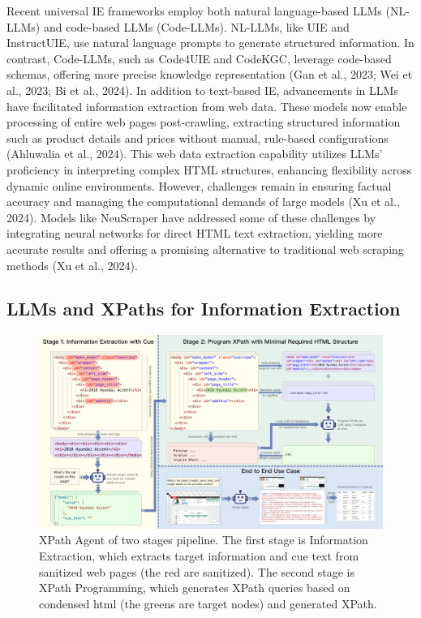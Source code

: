\documentclass[a4paper]{article}
\begin{document}
Recent universal IE frameworks employ both natural language-based LLMs (NL-LLMs) and code-based LLMs (Code-LLMs). NL-LLMs, like UIE and InstructUIE, use natural language prompts to generate structured information. In contrast, Code-LLMs, such as Code4UIE and CodeKGC, leverage code-based schemas, offering more precise knowledge representation (Gan et al., 2023; Wei et al., 2023; Bi et al., 2024). In addition to text-based IE, advancements in LLMs have facilitated information extraction from web data. These models now enable processing of entire web pages post-crawling, extracting structured information such as product details and prices without manual, rule-based configurations (Ahluwalia et al., 2024). This web data extraction capability utilizes LLMs’ proficiency in interpreting complex HTML structures, enhancing flexibility across dynamic online environments. However, challenges remain in ensuring factual accuracy and managing the computational demands of large models (Xu et al., 2024). Models like NeuScraper have addressed some of these challenges by integrating neural networks for direct HTML text extraction, yielding more accurate results and offering a promising alternative to traditional web scraping methods (Xu et al., 2024).

\subsection{LLMs and XPaths for Information Extraction}

\begin{figure}[h]
  \centering
  \includegraphics[width=1\textwidth]{./workflow.png}
  \caption{XPath Agent of two stages pipeline. The first stage is Information Extraction, which extracts target information and cue text from sanitized web pages (the red are sanitized). The second stage is XPath Programming, which generates XPath queries based on condensed html (the greens are target nodes) and generated XPath.}
  \label{fig:workflow}
  \vspace{20pt} %
\end{figure}
\end{document}
